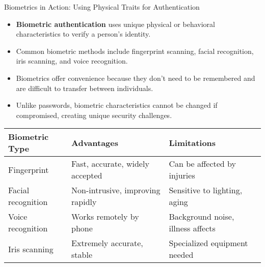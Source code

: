 \documentclass{beamer}
\begin{document}
\begin{frame}{Biometrics in Action: Using Physical Traits for Authentication}
    \begin{itemize}
        \item \textbf{Biometric authentication} uses unique physical or behavioral characteristics to verify a person's identity.
        \item Common biometric methods include fingerprint scanning, facial recognition, iris scanning, and voice recognition.
        \item Biometrics offer convenience because they don't need to be remembered and are difficult to transfer between individuals.
        \item Unlike passwords, biometric characteristics cannot be changed if compromised, creating unique security challenges.
    \end{itemize}
    
    \begin{table}
        \scriptsize
        \begin{tabular}{|l|l|l|}
            \hline
            \textbf{Biometric Type} & \textbf{Advantages} & \textbf{Limitations} \\
            \hline
            Fingerprint & Fast, accurate, widely accepted & Can be affected by injuries \\
            Facial recognition & Non-intrusive, improving rapidly & Sensitive to lighting, aging \\
            Voice recognition & Works remotely by phone & Background noise, illness affects \\
            Iris scanning & Extremely accurate, stable & Specialized equipment needed \\
            \hline
        \end{tabular}
    \end{table}
\end{frame}
\end{document}
